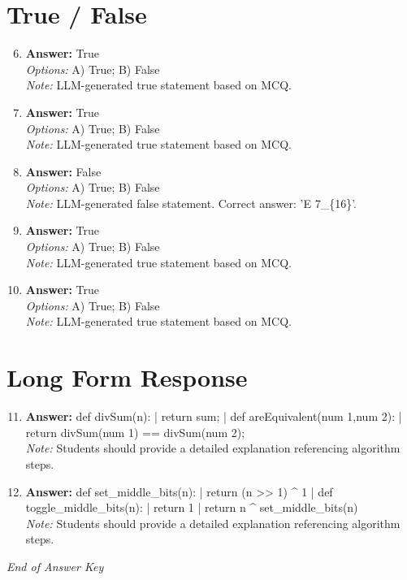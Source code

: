 \documentclass[12pt]{article}
\begin{document}
\section*{True / False}
\begin{enumerate}[label=\arabic*.]
\setcounter{enumi}{5}
\item \textbf{Answer:} True
\\ \textit{Options:} A) True; B) False
\\ \textit{Note:} LLM-generated true statement based on MCQ.
\item \textbf{Answer:} True
\\ \textit{Options:} A) True; B) False
\\ \textit{Note:} LLM-generated true statement based on MCQ.
\item \textbf{Answer:} False
\\ \textit{Options:} A) True; B) False
\\ \textit{Note:} LLM-generated false statement. Correct answer: 'E 7\_\{16\}'.
\item \textbf{Answer:} True
\\ \textit{Options:} A) True; B) False
\\ \textit{Note:} LLM-generated true statement based on MCQ.
\item \textbf{Answer:} True
\\ \textit{Options:} A) True; B) False
\\ \textit{Note:} LLM-generated true statement based on MCQ.
\end{enumerate}

\section*{Long Form Response}
\begin{enumerate}[label=\arabic*.]
\setcounter{enumi}{10}
\item \textbf{Answer:} def divSum(n): | return sum; | def areEquivalent(num 1,num 2): | return divSum(num 1) == divSum(num 2);
\\ \textit{Note:} Students should provide a detailed explanation referencing algorithm steps.
\item \textbf{Answer:} def set\_middle\_bits(n): | return (n \textgreater{}\textgreater{} 1) ^ 1 | def toggle\_middle\_bits(n): | return 1 | return n ^ set\_middle\_bits(n)
\\ \textit{Note:} Students should provide a detailed explanation referencing algorithm steps.
\end{enumerate}

\vfill
\noindent\textit{End of Answer Key}
\end{document}
